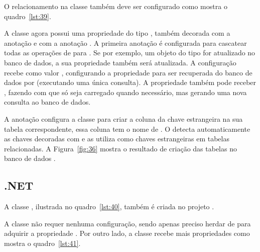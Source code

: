 O relacionamento na classe  também deve ser configurado como mostra o quadro~\ref{lst:39}.


A classe  agora possui uma propriedade do tipo , também decorada com a anotação  e com a anotação . A primeira anotação é configurada para cascatear todas as operações de  para . Se por exemplo, um objeto do tipo  for atualizado no banco de dados, a sua propriedade  também será atualizada. A configuração  recebe como valor , configurando a propriedade  para ser recuperada do banco de dados por  (executando uma única consulta). A propriedade  também pode receber , fazendo com que  só seja carregado quando necessário, mas gerando uma nova consulta ao banco de dados.

A anotação  configura a classe  para criar a coluna da chave estrangeira na sua tabela correspondente, essa coluna tem o nome de . O  detecta automaticamente as chaves decoradas com  e as utiliza como chaves estrangeiras em tabelas relacionadas. A Figura~\ref{fig:36} mostra o resultado de criação das tabelas no banco de dados . 


\subsection{.NET}

A classe , ilustrada no quadro~\ref{lst:40}, também é criada no projeto .


A classe  não requer nenhuma configuração, sendo apenas preciso herdar de  para adquirir a propriedade . Por outro lado, a classe  recebe mais propriedades como mostra o quadro~\ref{lst:41}.


